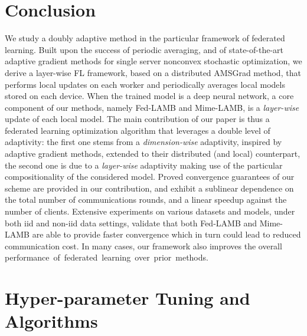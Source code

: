 \documentclass[nohyperref]{article}
\theoremstyle{plain}
\theoremstyle{definition}
\theoremstyle{remark}
\begin{document}
\section{Conclusion}\label{sec:conclusion}

We study a doubly adaptive method in the particular framework of federated learning.
Built upon the success of periodic averaging, and of state-of-the-art adaptive gradient methods for single server nonconvex stochastic optimization, we derive a layer-wise FL framework, based on a distributed AMSGrad method, that performs local updates on each worker and periodically averages local models stored on each device. 
When the trained model is a deep neural network, a core component of our methods, namely Fed-LAMB and Mime-LAMB, is a \emph{layer-wise} update of each local model.
The main contribution of our paper is thus a federated learning optimization algorithm that leverages a double level of adaptivity: the first one stems from a \emph{dimension-wise} adaptivity, inspired by adaptive gradient methods, extended to their distributed (and local) counterpart, the second one is due to a \emph{layer-wise} adaptivity making use of the particular compositionality of the considered model.
Proved convergence guarantees of our scheme are provided in our contribution, and exhibit a sublinear dependence on the total number of communications rounds, and a linear speedup against the number of clients. 
Extensive experiments on various datasets and models, under both iid and non-iid data settings, validate that both Fed-LAMB and Mime-LAMB are able to provide faster convergence  which in turn could lead to reduced communication cost. 
In many cases, our framework also improves the overall performance~of~federated~learning~over~prior~methods.




\clearpage
%






\clearpage


\appendix 
\onecolumn

 
 
 \section{Hyper-parameter Tuning and Algorithms} \label{app:experiment}
\end{document}

